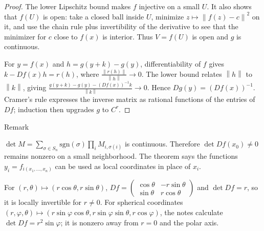 \begin{proof}

The lower Lipschitz bound makes \(f\) injective on a small \(U\). It also shows that \(f(U)\) is open: take a closed ball inside \(U\), minimize \(z\mapsto\left\| {f(z) - c} \right\|^{2}\) on it, and use the chain rule plus invertibility of the derivative to see that the minimizer for \(c\) close to \(f(x)\) is interior. Thus \(V = f(U)\) is open and \(g\) is continuous.

For \(y = f(x)\) and \(h = g\left( {y + k} \right) - g(y)\), differentiability of \(f\) gives \(k - Df(x)h = r(h)\), where \(\frac{\left\| {r(h)} \right\|}{\left\| h \right\|}\rightarrow 0\). The lower bound relates \(\left\| h \right\|\) to \(\left\| k \right\|\), giving \(\frac{g\left( {y + k} \right) - g(y) - \left( {Df(x)} \right)^{- 1}k}{\left\| k \right\|}\rightarrow 0\). Hence \(Dg(y) = \left( {Df(x)} \right)^{- 1}\). Cramer's rule expresses the inverse matrix as rational functions of the entries of \(Df\); induction then upgrades \(g\) to \(C^{r}\).

\end{proof}

\begin{qlremark}{Remark}

\(\det M = \sum_{\sigma \in S_{n}}\text{sgn}(\sigma)\prod_{i}M_{i,\sigma{(i)}}\) is continuous. Therefore \(\det Df\left( x_{0} \right) \neq 0\) remains nonzero on a small neighborhood. The theorem says the functions \(y_{i} = f_{i{({x_{1},\ldots,x_{n}})}}\) can be used as local coordinates in place of \(x_{i}\).

\end{qlremark}

\begin{example}

For \(\left( {r,\theta} \right)\mapsto\left( {r\cos\theta,r\sin\theta} \right)\), \(Df = \begin{pmatrix}
{\cos\theta} & {- r\sin\theta} \\
{\sin\theta} & {r\cos\theta}
\end{pmatrix}\) and \(\det Df = r\), so it is locally invertible for \(r \neq 0\). For spherical coordinates \(\left( {r,\varphi,\theta} \right)\mapsto\left( {r\sin\varphi\cos\theta,r\sin\varphi\sin\theta,r\cos\varphi} \right)\), the notes calculate \(\det Df = r^{2}\sin\varphi\); it is nonzero away from \(r = 0\) and the polar axis.

\end{example}

